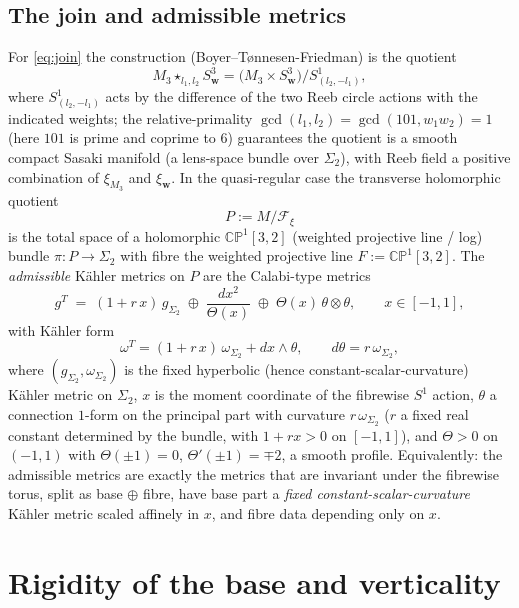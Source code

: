 \documentclass{amsart}
\theoremstyle{definition}
\begin{document}
\subsection{The join and admissible metrics}\label{ss:admissible}
For \eqref{eq:join} the construction (Boyer--T\o nnesen-Friedman) is the quotient
\[
  M_3\star_{l_1,l_2}S^3_{\mathbf w}
  =\bigl(M_3\times S^3_{\mathbf w}\bigr)/S^1_{(l_2,-l_1)},
\]
where $S^1_{(l_2,-l_1)}$ acts by the difference of the two Reeb circle actions
with the indicated weights; the relative-primality $\gcd(l_1,l_2)=\gcd(101,
w_1w_2)=1$ (here $101$ is prime and coprime to $6$) guarantees the quotient is a
smooth compact Sasaki manifold (a lens-space bundle over $\Sigma_2$), with Reeb
field a positive combination of $\xi_{M_3}$ and $\xi_{\mathbf w}$. In the
quasi-regular case the transverse holomorphic quotient
\[
  P:=M/\mathcal F_\xi
\]
is the total space of a holomorphic $\mathbb{CP}^1[3,2]$ (weighted projective
line / log) bundle $\pi\colon P\to\Sigma_2$ with fibre the weighted projective
line $F:=\mathbb{CP}^1[3,2]$. The \emph{admissible} K\"ahler metrics on $P$ are
the Calabi-type metrics
\begin{equation}\label{eq:admissible}
  g^T \;=\; (1+r\,x)\,g_{\Sigma_2} \;\oplus\; \frac{d x^2}{\Theta(x)} \;\oplus\;
  \Theta(x)\,\theta\otimes\theta,\qquad x\in[-1,1],
\end{equation}
with K\"ahler form
\begin{equation}\label{eq:admissibleform}
  \omega^T=(1+r\,x)\,\omega_{\Sigma_2}+dx\wedge\theta ,\qquad d\theta=r\,\omega_{\Sigma_2},
\end{equation}
where $(g_{\Sigma_2},\omega_{\Sigma_2})$ is the fixed hyperbolic (hence
constant-scalar-curvature) K\"ahler metric on $\Sigma_2$, $x$ is the moment
coordinate of the fibrewise $S^1$ action, $\theta$ a connection $1$-form on the
principal part with curvature $r\,\omega_{\Sigma_2}$ ($r$ a fixed real constant
determined by the bundle, with $1+rx>0$ on $[-1,1]$), and $\Theta>0$ on
$(-1,1)$ with $\Theta(\pm1)=0$, $\Theta'(\pm1)=\mp2$, a smooth profile.
Equivalently: the admissible metrics are exactly the metrics that are invariant
under the fibrewise torus, split as base $\oplus$ fibre, have base part a
\emph{fixed constant-scalar-curvature} K\"ahler metric scaled affinely in $x$,
and fibre data depending only on $x$.

\section{Rigidity of the base and verticality}
\end{document}
